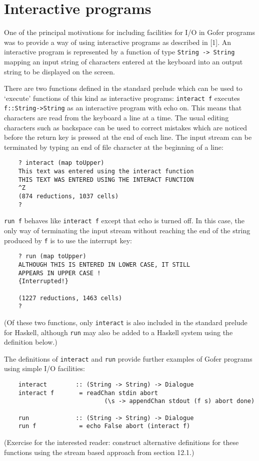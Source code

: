 \section{Interactive programs}
One of the principal motivations for including facilities  for  I/O  in
Gofer programs was to provide a way of using  interactive  programs  as
described in [1].  An interactive program is represented by a  function
of type \verb"String -> String" mapping an input string of characters  entered
at the keyboard into an output string to be displayed on the screen.

There are two functions defined in the standard prelude  which  can  be
used to `execute' functions of this kind as interactive programs:
\BI
\IT  \verb"interact f" executes 
     \verb"f::String->String" as an interactive  program
     with echo on.  This  means  that  characters  are  read  from  the
     keyboard a line at a time.  The usual editing characters  such  as
     backspace can be used to correct mistakes which are noticed before
     the return key is pressed at the end  of  each  line.   The  input
     stream can be terminated by typing an end of file character at the
     beginning of a line:
\begin{verbatim}
    ? interact (map toUpper)
    This text was entered using the interact function
    THIS TEXT WAS ENTERED USING THE INTERACT FUNCTION
    ^Z
    (874 reductions, 1037 cells)
    ?
\end{verbatim}
\IT  \verb"run f" behaves like 
     \verb"interact f" except that echo is turned  off.
     In this case, the only way of terminating the input stream without
     reaching the end of the string produced  by  \verb"f"  is  to  use  the
     interrupt key:
\begin{verbatim}
    ? run (map toUpper)     
    ALTHOUGH THIS IS ENTERED IN LOWER CASE, IT STILL
    APPEARS IN UPPER CASE !
    {Interrupted!}

    (1227 reductions, 1463 cells)
    ?
\end{verbatim}
\EI
(Of these two functions, only \verb"interact" is also included in the
standard prelude for Haskell, although \verb"run" may also  be  added  to  a
Haskell system using the definition below.)

The definitions of \verb"interact" and \verb"run"  
provide  further  examples  of
Gofer programs using simple I/O facilities:
\begin{verbatim}
    interact        :: (String -> String) -> Dialogue
    interact f       = readChan stdin abort
                            (\s -> appendChan stdout (f s) abort done)
 
    run             :: (String -> String) -> Dialogue
    run f            = echo False abort (interact f)
\end{verbatim} 
(Exercise for the interested reader:  construct alternative definitions
for these functions using the stream based approach from section 12.1.)

